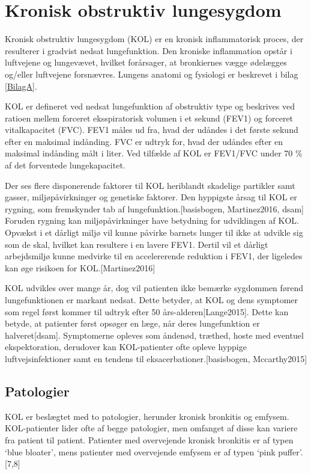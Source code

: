 \section{Kronisk obstruktiv lungesygdom}
Kronisk obstruktiv lungesygdom (KOL) er en kronisk inflammatorisk proces, der resulterer i gradvist nedsat lungefunktion. Den kroniske inflammation opstår i luftvejene og lungevævet, hvilket forårsager, at bronkiernes vægge ødelægges og/eller luftvejene forsnævres.\citep{Basisbogen2016} Lungens anatomi og fysiologi er beskrevet i bilag \ref{BilagA}. 

KOL er defineret ved nedsat lungefunktion af obstruktiv type og beskrives ved ratioen mellem forceret eksspiratorisk volumen i et sekund (FEV1) og forceret vitalkapacitet (FVC). FEV1 måles ud fra, hvad der udåndes i det første sekund efter en maksimal indånding. FVC er udtryk for, hvad der udåndes efter en maksimal indånding målt i liter. Ved tilfælde af KOL er FEV1/FVC under 70 \% af det forventede lungekapacitet. 

Der ses flere disponerende faktorer til KOL heriblandt skadelige partikler samt gasser, miljøpåvirkninger og genetiske faktorer. Den hyppigste årsag til KOL er rygning, som fremskynder tab af lungefunktion.[basisbogen, Martinez2016, dsam] Foruden rygning kan miljøpåvirkninger have betydning for udviklingen af KOL. Opvækst i et dårligt miljø vil kunne påvirke barnets lunger til ikke at udvikle sig som de skal, hvilket kan resultere i en lavere FEV1. Dertil vil et dårligt arbejdsmiljø kunne medvirke til en accelererende reduktion i FEV1, der ligeledes kan øge risikoen for KOL.[Martinez2016] 

KOL udvikles over mange år, dog vil patienten ikke bemærke sygdommen førend lungefunktionen er markant nedsat. Dette betyder, at KOL og dens symptomer som regel først kommer til udtryk efter 50 års-alderen[Lange2015]. Dette kan betyde, at patienter først opsøger en læge, når deres lungefunktion er halveret[dsam]. Symptomerne opleves som åndenød, træthed, hoste med eventuel ekspektoration, derudover kan KOL-patienter ofte opleve hyppige luftvejsinfektioner samt en tendens til eksacerbationer.[basisbogen, Mccarthy2015]  

\subsection{Patologier}
KOL er beslægtet med to patologier, herunder kronisk bronkitis og emfysem. KOL-patienter lider ofte af begge patologier, men omfanget af disse kan variere fra patient til patient. Patienter med overvejende kronisk bronkitis er af typen ‘blue bloater’, mens patienter med overvejende emfysem er af typen ‘pink puffer'.[7,8]

